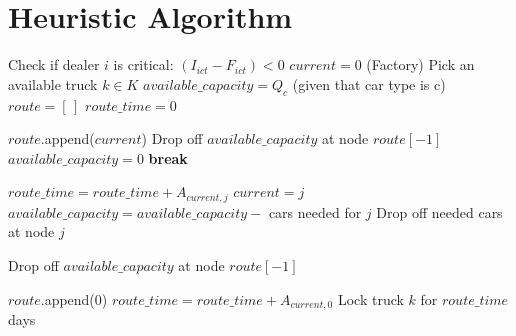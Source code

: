 \documentclass{article}
\begin{document}
\section*{Heuristic Algorithm}

\begin{algorithm}[H]
\caption{Greedy Insertion Heuristic}
\begin{algorithmic}[1]
            \State Check if dealer $i$ is critical: $(I_{ict} - F_{ict}) < 0$
        \EndFor
            \State $current = 0$ (Factory)
            \State Pick an available truck $k \in K$
            \State $available\_capacity = Q_c$ (given that car type is c)
            \State $route = [\,]$
            \State $route\_time = 0$

                \State $route$.append($current$)
                                \State Drop off $available\_capacity$ at node $route[-1]$
                            \EndIf
                            \State $available\_capacity = 0$
                            \State \textbf{break}
                        \EndIf

                        \State $route\_time = route\_time + A_{current, j}$
                        \State $current = j$
                        \State $available\_capacity = available\_capacity - $ cars needed for $j$
                        \State Drop off needed cars at node $j$
                    \EndIf
                \EndFor
            \EndWhile

                    \State Drop off $available\_capacity$ at node $route[-1]$
                \EndIf
            \EndIf

            \State $route$.append($0$)
            \State $route\_time = route\_time + A_{current, 0}$
            \State Lock truck $k$ for $route\_time$ days
        \EndWhile
    \EndFor
\EndFor
\end{algorithmic}
\end{algorithm}
\end{document}
